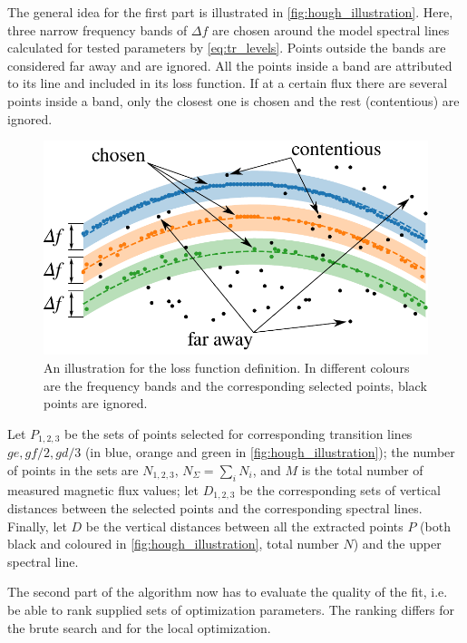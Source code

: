\documentclass[%
 aip,
 amsmath,amssymb,
 reprint,%
]{revtex4-1}
\begin{document}
The general idea for the first part is illustrated in \autoref{fig:hough_illustration}. Here, three narrow frequency bands of $\Delta f$ are chosen around the model spectral lines calculated for tested parameters by \eqref{eq:tr_levels}. Points outside the bands are considered far away and are ignored. All the points inside a band are attributed to its line and included in its loss function. If at a certain flux there are several points inside a band, only the closest one is chosen and the rest (contentious) are ignored. 
\begin{figure}[b]
	\centering
	\includegraphics[width=0.8\linewidth]{hough_illustration}
	\caption{An illustration for the loss function definition. In different colours are the frequency bands and the corresponding selected points, black points are ignored.}
	\label{fig:hough_illustration}
\end{figure}
Let $P_{1,2,3}$ be the sets of points selected for corresponding transition lines $ge, gf/2, gd/3$ (in blue, orange and green in \autoref{fig:hough_illustration}); the number of points in the sets are $N_{1,2,3}$, $N_\Sigma = \sum_i N_i$, and $M$ is the total number of measured magnetic flux values; let $D_{1,2,3}$ be the corresponding sets of vertical distances between the selected points and the corresponding spectral lines. Finally, let $D$ be the vertical distances between all the extracted points $P$ (both black and coloured in \autoref{fig:hough_illustration}, total number $N$) and the upper spectral line.


The second part of the algorithm now has to evaluate the quality of the fit, i.e. be able to rank supplied sets of optimization parameters. The ranking differs for the brute search and for the local optimization. 
\end{document}

